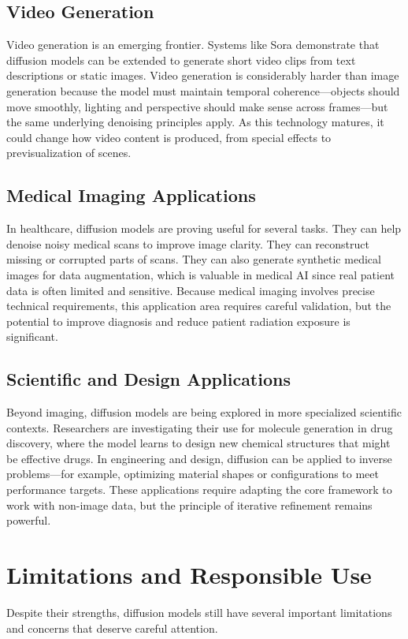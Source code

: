 \documentclass[a4paper,12pt]{article}
\begin{document}
\subsection{Video Generation}
Video generation is an emerging frontier. Systems like Sora demonstrate that diffusion models can be extended to generate short video clips from text descriptions or static images. Video generation is considerably harder than image generation because the model must maintain temporal coherence---objects should move smoothly, lighting and perspective should make sense across frames---but the same underlying denoising principles apply. As this technology matures, it could change how video content is produced, from special effects to previsualization of scenes.

\subsection{Medical Imaging Applications}
In healthcare, diffusion models are proving useful for several tasks. They can help denoise noisy medical scans to improve image clarity. They can reconstruct missing or corrupted parts of scans. They can also generate synthetic medical images for data augmentation, which is valuable in medical AI since real patient data is often limited and sensitive. Because medical imaging involves precise technical requirements, this application area requires careful validation, but the potential to improve diagnosis and reduce patient radiation exposure is significant.

\subsection{Scientific and Design Applications}
Beyond imaging, diffusion models are being explored in more specialized scientific contexts. Researchers are investigating their use for molecule generation in drug discovery, where the model learns to design new chemical structures that might be effective drugs. In engineering and design, diffusion can be applied to inverse problems---for example, optimizing material shapes or configurations to meet performance targets. These applications require adapting the core framework to work with non-image data, but the principle of iterative refinement remains powerful.

\section{Limitations and Responsible Use}
Despite their strengths, diffusion models still have several important limitations and concerns that deserve careful attention.
\end{document}
